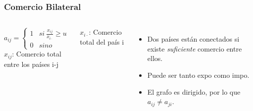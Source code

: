 \documentclass[compress]{beamer}
\begin{document}
		\begin{frame}
\frametitle{Comercio Bilateral}

\begin{columns}[t]
	
	$$
	a_{ij} = 
	\begin{cases} 
	1 & si \ \frac{x_{ij}}{x_{i\cdot}}\geq u \\
	0 & sino 
	\end{cases}
	$$
	$x_{ij}$: Comercio total entre los países i-j \par
	$x_{i\cdot}$: Comercio total del país i
	
	
	\begin{itemize}[label=\faRebel]
		\item Dos países están conectados si existe \textit{suficiente} comercio entre ellos.
		\item Puede ser tanto expo como impo.
		\item El grafo es dirigido, por lo que $a_{ij} \neq a_{ji}$.
	\end{itemize}
	
\end{columns}

\end{frame}
\end{document}
